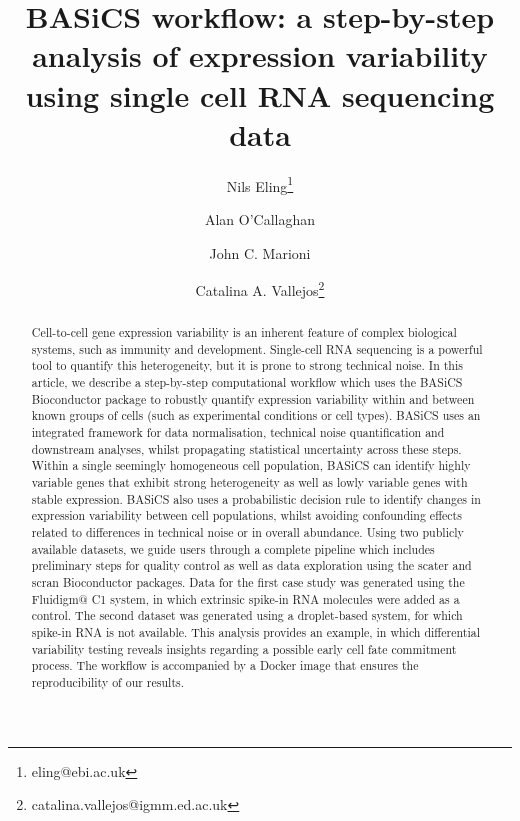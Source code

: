 \documentclass[9pt,a4paper,]{extarticle}
\begin{document}
\pagestyle{front}

\title{BASiCS workflow: a step-by-step analysis of expression variability using single cell RNA sequencing data}

\author[1,2]{Nils Eling\thanks{\ttfamily eling@ebi.ac.uk}}
\author[3]{Alan O'Callaghan}
\author[1,2]{John C. Marioni}
\author[3,4]{Catalina A. Vallejos\thanks{\ttfamily catalina.vallejos@igmm.ed.ac.uk}}

\maketitle
\thispagestyle{front}

\begin{abstract}
Cell-to-cell gene expression variability is an inherent feature of complex
biological systems, such as immunity and development. Single-cell RNA
sequencing is a powerful tool to quantify this heterogeneity, but it is prone
to strong technical noise. In this article, we describe a step-by-step
computational workflow which uses the BASiCS Bioconductor package to robustly
quantify expression variability within and between known groups of cells (such
as experimental conditions or cell types). BASiCS uses an integrated framework
for data normalisation, technical noise quantification and downstream
analyses, whilst propagating statistical uncertainty across these steps.
Within a single seemingly homogeneous cell population, BASiCS can identify
highly variable genes that exhibit strong heterogeneity as well as lowly
variable genes with stable expression. BASiCS also uses a probabilistic
decision rule to identify changes in expression variability between cell
populations, whilst avoiding confounding effects related to differences in
technical noise or in overall abundance. Using two publicly available
datasets, we guide users through a complete pipeline which includes
preliminary steps for quality control as well as data exploration
using the scater and scran Bioconductor packages. Data for the first case
study was generated using the Fluidigm@ C1 system, in which extrinsic
spike-in RNA molecules were added as a control. The second dataset was
generated using a droplet-based system, for which spike-in RNA is not
available. This analysis provides an example, in which differential
variability testing reveals insights regarding a possible early cell fate
commitment process. The workflow is accompanied by a Docker image that
ensures the reproducibility of our results.
\end{abstract}
\end{document}
